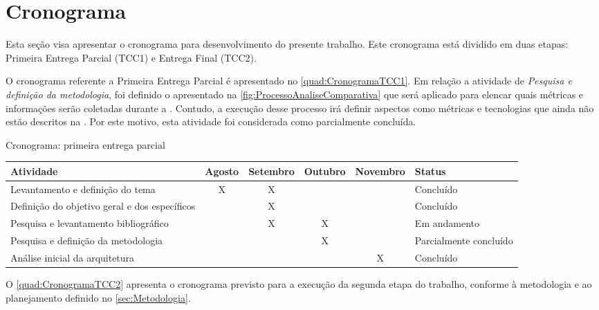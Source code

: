 \section{Cronograma}

Esta seção visa apresentar o cronograma para desenvolvimento do presente trabalho. Este
cronograma está dividido em duas etapas: Primeira Entrega Parcial (\gls{TCC1}) e Entrega Final
(\gls{TCC2}).

O cronograma referente a Primeira Entrega Parcial é apresentado no \autoref{quad:CronogramaTCC1}.
Em relação a atividade de \textit{Pesquisa e definição da metodologia}, foi definido o
 apresentado na \autoref{fig:ProcessoAnaliseComparativa}
que será aplicado para elencar quais métricas e informações serão coletadas durante a
.  Contudo, a execução desse processo irá definir aspectos como métricas
e tecnologias que ainda não estão descritos na . Por este motivo,
esta atividade foi considerada como parcialmente concluída.

\begin{quadro}
    \caption{Cronograma: primeira entrega parcial\label{quad:CronogramaTCC1}}
    \begin{tabular}{ | m{4cm} | c | c | c | c | m{2.5cm} | }
    \hline
    \textbf{Atividade} &
        \textbf{Agosto} &
        \textbf{Setembro} &
        \textbf{Outubro} &
        \textbf{Novembro} &
        \textbf{Status} \\ \hline
    Levantamento e definição do tema &
        X &
        X &
        &
        &
        Concluído \\ \hline
    Definição do objetivo geral e dos específicos &
        &
        X &
        &
        &
        Concluído \\ \hline
    Pesquisa e levantamento bibliográfico &
        &
        X &
        X &
        &
        Em andamento \\ \hline
    Pesquisa e definição da metodologia &
        &
        &
        X &
        &
        Parcialmente concluído \\ \hline
    Análise inicial da arquitetura &
        &
        &
        &
        X &
        Concluído \\ \hline
    \end{tabular}
\end{quadro}

O \autoref{quad:CronogramaTCC2} apresenta o cronograma previsto para a execução
da segunda etapa do trabalho, conforme à metodologia e ao planejamento definido no
\autoref{sec:Metodologia}.

